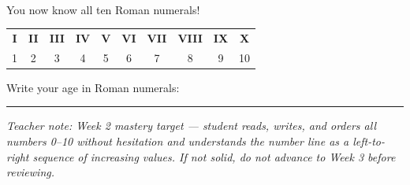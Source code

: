 \documentclass[12pt,letterpaper]{article}
\begin{document}
\vfill
{}\\
You now know all ten Roman numerals!\\[4pt]
\begin{center}
\begin{tabular}{cccccccccc}
\textbf{I}&\textbf{II}&\textbf{III}&\textbf{IV}&\textbf{V}&
\textbf{VI}&\textbf{VII}&\textbf{VIII}&\textbf{IX}&\textbf{X}\\[2pt]
1&2&3&4&5&6&7&8&9&10
\end{tabular}
\end{center}
\vspace{4pt}
Write your age in Roman numerals: \quad\ansblank

\vspace{4pt}\hrule\vspace{3pt}
{\footnotesize\color{gray}\textit{Teacher note: Week 2 mastery target — student reads,
writes, and orders all numbers 0–10 without hesitation and understands
the number line as a left-to-right sequence of increasing values.
If not solid, do not advance to Week 3 before reviewing.}}
\end{document}
